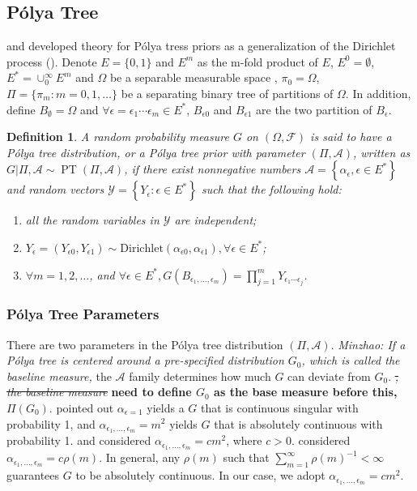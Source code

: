 \documentclass[12pt]{article}
\newtheorem{deff}[thm]{Definition}
\newcommand{\polya}{P\'{o}lya}
\DeclareMathOperator{\pt}{PT}
\begin{document}
\subsection{\polya{} Tree}
\citet{lavine1992, lavine1994} and \citet{mauldin1992} developed theory for
\polya{} tress priors as a generalization of the Dirichlet
process (\citet{ferguson1974}). Denote $E=\{0,1\}$ and $E^m$ as the m-fold
product of $E$, $E^0= \emptyset$, $E^{*} = \cup_0^{\infty} E^m$ and $\Omega$ be a separable
measurable space , $\pi_0 = \Omega$, $\Pi= \{ \pi_m: m=0,1, \ldots \}
$ be a separating binary tree of partitions of $\Omega$. In addition,
define $B_{\emptyset} = \Omega$ and $\forall \epsilon=\epsilon_1\cdots
\epsilon_m \in E^{*}$, $B_{\epsilon 0}$ and $B_{\epsilon 1}$ are the
two partition of $B_{\epsilon}$.  
\begin{deff}
  A random probability measure $G$ on $(\Omega, \mathcal{F})$ is said to
  have a \polya{} tree distribution, or a \polya{} tree prior with
  parameter $(\Pi, \mathcal{A})$, written as $G|\Pi, \mathcal{A} \sim
  \pt (\Pi, \mathcal{A})$, if there exist nonnegative numbers
  $\mathcal{A}= \left\{ \alpha_{\epsilon}, \epsilon \in E^{*} \right\}$
  and random vectors $\mathcal{Y} = \left\{ Y_{\epsilon} : \epsilon \in
    E^{*} \right\}$ such that the following hold:
  \begin{enumerate}
  \item\label{item:1} all the random variables in $\mathcal{Y}$ are independent;
  \item $Y_{\epsilon}= (Y_{\epsilon 0} , Y_{\epsilon 1}) \sim
    \mathrm{Dirichlet}(\alpha_{\epsilon 0 }, \alpha_{\epsilon 1}),
    \forall \epsilon \in E^{*}$;
  \item $\forall m=1,2, \ldots$, and $\forall \epsilon \in E^{*},
    G(B_{\epsilon_{1}, \ldots, \epsilon_m}) = \prod_{j=1}^m Y_{\epsilon_1
      \cdots \epsilon_j}$.
  \end{enumerate} 
\end{deff}

\subsubsection{\polya{} Tree Parameters}
There are two parameters in the \polya{} tree distribution $(\Pi,
\mathcal{A})$. {\it Minzhao: If a \polya{} tree is centered around a
  pre-specified distribution $G_0$, which is called the baseline
  measure, } the $\mathcal{A}$ family determines how much $G$ can
deviate from $G_0$. {\it \sout{ , the baseline measure}} {\bf need to define $G_0$ as
  the base measure before this, $\Pi(G_0)$}. \citet{ferguson1974} pointed out
$\alpha_{\epsilon = 1} $ yields a $G$ that is continuous singular with
probability 1, and $\alpha_{\epsilon_1, \ldots, \epsilon_m} = m^2$
yields $G$ that is absolutely continuous with probability 1. \citet{walker1999}
and \citet{paddock1999} considered $\alpha_{\epsilon_1,
  \ldots, \epsilon_m} = cm^2$, where $c > 0$. \citet{berger2001}
considered $\alpha_{\epsilon_1, \ldots, \epsilon_m} = c 
\rho(m)$. In general, any $\rho(m) $ such that $\sum_{m=1}^{\infty}
\rho(m)^{-1} < \infty$ guarantees $G$ to be absolutely continuous. In
our case, we adopt $\alpha_{\epsilon_1, \ldots, \epsilon_m} = cm^2$.
\end{document}
